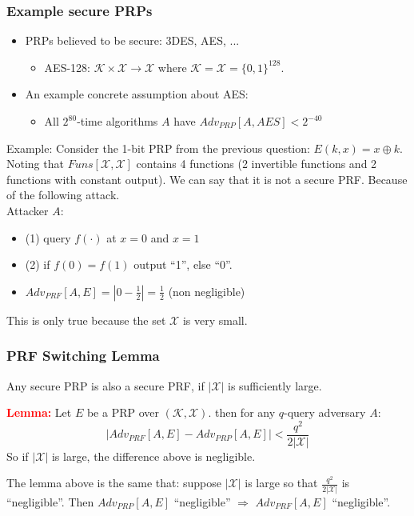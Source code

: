 \documentclass[12pt]{book}
\newcommand{\Lemma}{\textcolor{red}{\textbf{Lemma:}} }
\begin{document}
\subsubsection{Example secure PRPs}
\begin{itemize}
	\item PRPs believed to be secure: 3DES, AES, ...
	\begin{itemize}
		\item[] AES-128: $\mathcal{K}\times\mathcal{X}\rightarrow\mathcal{X}$ where $\mathcal{K}=\mathcal{X}=\{0,1\}^{128}$.
	\end{itemize}
	\item An example concrete assumption about AES:
	\begin{itemize}
		\item[] All $2^{80}$-time algorithms $A$ have $Adv_{PRP}[A,AES]<2^{-40}$
	\end{itemize}
\end{itemize}

Example: Consider the 1-bit PRP from the previous question: $E(k,x)=x\oplus k$. Noting that $Funs[\mathcal{X},\mathcal{X}]$ contains 4 functions (2 invertible functions and 2 functions with constant output). We can say that it is not a secure PRF. Because of the following attack.\\
Attacker $A$:
\begin{itemize}
	\item[] (1) query $f(\cdot)$ at $x=0$ and $x=1$
	\item[] (2) if $f(0)=f(1)$ output ``1'', else ``0''.
	\item[] $Adv_{PRF}[A,E]=|0-\frac{1}{2}|=\frac{1}{2}$ (non negligible)
\end{itemize}

This is only true because the set $\mathcal{X}$ is very small.

\subsubsection{PRF Switching Lemma}
Any secure PRP is also a secure PRF, if $|\mathcal{X}|$ is sufficiently large.

\Lemma Let $E$ be a PRP over $(\mathcal{K},\mathcal{X})$. then for any $q$-query adversary $A$: $$\big|Adv_{PRF}[A,E]-Adv_{PRP}[A,E]\big|<\frac{q^{2}}{2|\mathcal{X}|}$$So if $|\mathcal{X}|$ is large, the difference above is negligible.

The lemma above is the same that: suppose $|\mathcal{X}|$ is large so that $\frac{q^{2}}{2|\mathcal{X}|}$ is ``negligible''. Then $Adv_{PRP}[A,E]$ ``negligible'' $\Rightarrow$ $Adv_{PRF}[A,E]$ ``negligible''.
\end{document}
